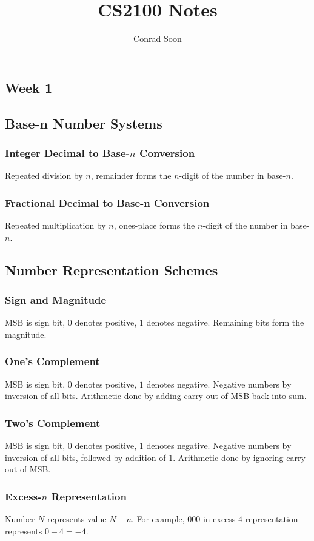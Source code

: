 \documentclass{article}
\title{CS2100 Notes}
\author{Conrad Soon}
\begin{document}
\begin{multicols*}{3}
\maketitle
\section{Week 1}
\subsection{Base-n Number Systems}
\subsubsection{Integer Decimal to Base-$n$ Conversion}
Repeated division by $n$, remainder forms the $n$-digit of the number in base-$n$.
\subsubsection{Fractional Decimal to Base-n Conversion}
Repeated multiplication by $n$, ones-place forms the $n$-digit of the number in base-$n$.
\subsection{Number Representation Schemes}
\subsubsection{Sign and Magnitude}
MSB is sign bit, $0$ denotes positive, $1$ denotes negative. Remaining bits form the magnitude.
\subsubsection{One's Complement}
MSB is sign bit, $0$ denotes positive, $1$ denotes negative.
Negative numbers by inversion of all bits.
Arithmetic done by adding carry-out of MSB back into sum.
\subsubsection{Two's Complement}
MSB is sign bit, $0$ denotes positive, $1$ denotes negative.
Negative numbers by inversion of all bits, followed by addition of $1$.
Arithmetic done by ignoring carry out of MSB.
\subsubsection{Excess-$n$ Representation}
Number $N$ represents value $N-n$. For example, $000$ in excess-$4$ representation represents $0-4=-4$.


\end{multicols*}
\end{document}
